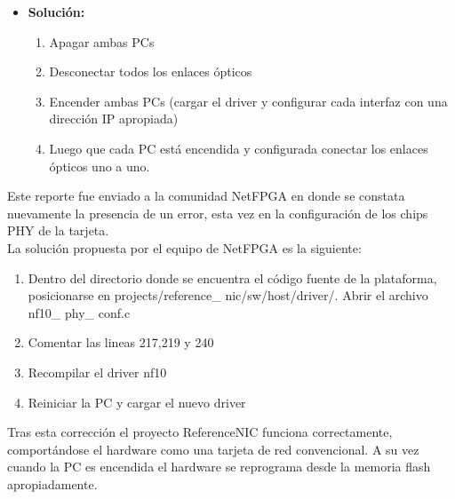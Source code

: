 \begin{itemize}
\item \textbf{Soluci\'on:}
\begin{enumerate}
\item Apagar ambas PCs
\item Desconectar todos los enlaces \'opticos
\item Encender ambas PCs (cargar el driver y configurar cada interfaz con una direcci\'on IP apropiada)
\item Luego que cada PC est\'a encendida y configurada conectar los enlaces \'opticos uno a uno.
\end{enumerate}

\end{itemize}

Este reporte fue enviado a la comunidad NetFPGA en donde se constata nuevamente la presencia de un error, esta vez en la configuraci\'on de los chips PHY de la tarjeta.\\ 

La soluci\'on propuesta por el equipo de NetFPGA es la siguiente:

\begin{enumerate}
\item Dentro del directorio donde se encuentra el c\'odigo fuente de la plataforma, posicionarse en 
	  projects/reference\_ nic/sw/host/driver/. Abrir el archivo nf10\_ phy\_ conf.c 
\item Comentar las lineas 217,219 y 240
\item Recompilar el driver nf10
\item Reiniciar la PC y cargar el nuevo driver
\end{enumerate}

Tras esta correcci\'on el proyecto ReferenceNIC funciona correctamente, comportándose el hardware como una tarjeta de red convencional. A su vez cuando la PC es encendida el hardware se reprograma desde la memoria flash apropiadamente.


